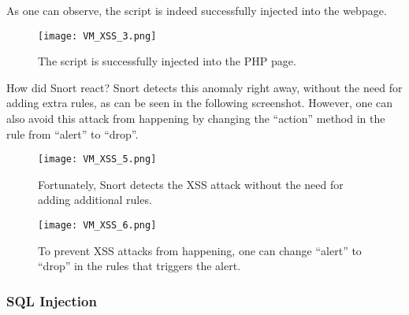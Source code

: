 As one can observe, the script is indeed successfully injected into the webpage.

\begin{figure}[h]
    \centering
    \texttt{[image: VM\_XSS\_3.png]}
    \caption{The script is successfully injected into the PHP page.}
\end{figure}

How did Snort react? Snort detects this anomaly right away, without the need for adding extra rules, as can be seen in the following screenshot. However, one can also avoid this attack from happening by changing the ``action'' method in the rule from ``alert'' to ``drop''.

\begin{figure}[h]
    \centering
    \texttt{[image: VM\_XSS\_5.png]}
    \caption{Fortunately, Snort detects the XSS attack without the need for adding additional rules.}
\end{figure}

\begin{figure}[h]
    \centering
    \texttt{[image: VM\_XSS\_6.png]}
    \caption{To prevent XSS attacks from happening, one can change ``alert'' to ``drop'' in the rules that triggers the alert.}
\end{figure}

\clearpage

\subsubsection{SQL Injection}

